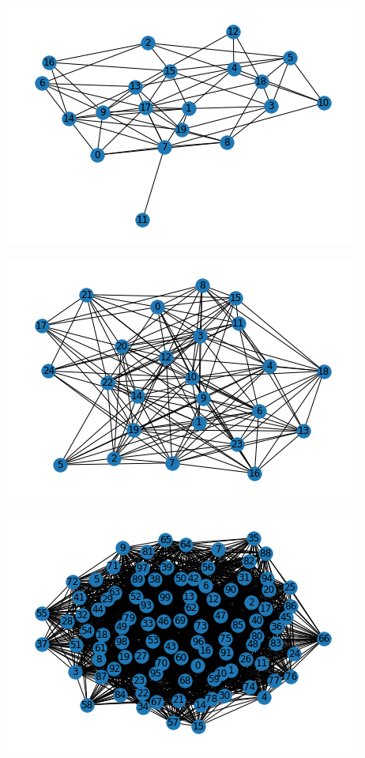 \documentclass[11pt]{article}
\begin{document}
\begin{center}
\begin{minipage}{0.48\linewidth}
\includegraphics[width=\linewidth]{output_1}
\end{minipage}%
\begin{minipage}{0.49\linewidth}
\includegraphics[width=\linewidth]{output_2}
\end{minipage}
\begin{minipage}{0.49\linewidth}
\includegraphics[width=\linewidth]{output_3}
\end{minipage}
\end{center}
\end{document}
